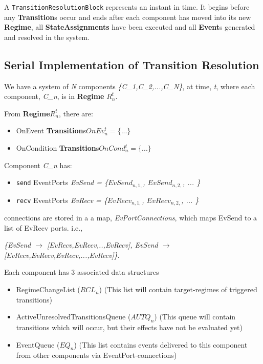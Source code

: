 \documentclass{article}
\newcommand{\EventPort}{{\bf{EventPort}}\xspace}
\newcommand{\Events}{{\bf{Event}}s\xspace}
\newcommand{\Regime}{{\bf{Regime}}\xspace}
\newcommand{\Transitions}{{\bf{Transition}}s\xspace}
\begin{document}
A {\tt TransitionResolutionBlock} represents an instant in time. It begins
before any \Transitions occur and ends after each component has moved
into its new \Regime, all \textbf{StateAssignments} have been executed
and all \Events generated and resolved in the system.

\subsection{Serial Implementation of Transition Resolution}

\newcommand{\CN}[0]{\textsl{C\_n}}

We have a system of \textsl{N} components \textsl{\{C\_1,C\_2,...,C\_N\}},
at time, \textsl{t}, where each component, \CN, is in \Regime
$R^{t}_{n}$.

\noindent From \Regime $R^{t}_{n}$, there are:
\begin{itemize}
\item OnEvent \Transitions $OnEv^{t}_{n} = \{ ... \}$
\item OnCondition \Transitions $OnCond^{t}_{n} = \{ ... \}$
\end{itemize}

\newcommand{\send}[0]{\texttt{send} }
\newcommand{\recv}[0]{\texttt{recv} }

\noindent Component \CN
has:
\begin{itemize}
\item \send EventPorts \textsl{EvSend = \{$EvSend_{n,1,}$, $EvSend_{n,2,}$, ...  \}}
\item \recv EventPorts \textsl{EvRecv = \{$EvRecv_{n,1,}$, $EvRecv_{n,2,}$, ...  \}}
\end{itemize}

\noindent \EventPort connections are stored in a a map,
\textsl{EvPortConnections}, which maps EvSend to a list of EvRecv ports. i.e.,

\textsl{\{EvSend $\rightarrow$ [EvRecv,EvRecv,..,EvRecv], EvSend $\rightarrow$
[EvRecv,EvRecv,EvRecv,...,EvRecv]\}}.

\newcommand{\RCLn}{$RCL_n$}
\newcommand{\AUTQn}{$AUTQ_n$}
\newcommand{\EQn}{$EQ_n$}

\noindent Each component has 3 associated data structures
\begin{itemize}
\item RegimeChangeList (\RCLn) (This list will contain target-regimes of
triggered transitions)
\item ActiveUnresolvedTransitionsQueue (\AUTQn) (This queue will
contain transitions which will occur, but their effects have not be
evaluated yet)
\item EventQueue (\EQn) (This list contains events delivered to this
component from other components via EventPort-connections)
\end{itemize}
\end{document}
